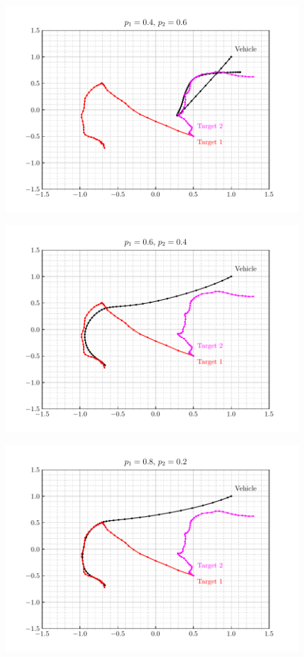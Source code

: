 \documentclass[12pt]{article}
\begin{document}
\begin{figure}[H]
    \centering
    \includegraphics{../../src/task_4/output/ex_4_i=3.pdf}
\end{figure}

\begin{figure}[H]
    \centering
    \includegraphics{../../src/task_4/output/ex_4_i=4.pdf}
\end{figure}

\begin{figure}[H]
    \centering
    \includegraphics{../../src/task_4/output/ex_4_i=5.pdf}
\end{figure}
\end{document}
